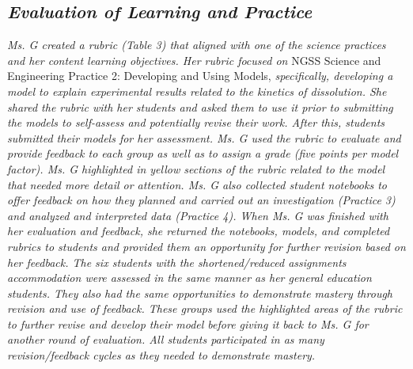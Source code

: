 \documentclass[11pt]{sig-alternate}
\begin{document}
\begin{large}
\subsection*{\textit{\textbf{Evaluation of Learning and Practice}}}
\textit{Ms. G created a rubric (Table 3) that aligned with one of the science practices and her content learning objectives. Her rubric focused on} NGSS Science and Engineering Practice 2: Developing and Using Models, \textit{specifically, developing a model to explain experimental results related to the kinetics of dissolution. She shared the rubric with her students and asked them to use it prior to submitting the models to self-assess and potentially revise their work. After this, students submitted their models for her assessment. Ms. G used the rubric to evaluate and provide feedback to each group as well as to assign a grade (five points per model factor). Ms. G highlighted in yellow sections of the rubric related to the model that needed more detail or attention. Ms. G also collected student notebooks to offer feedback on how they planned and carried out an investigation (Practice 3) and analyzed and interpreted data (Practice 4). When Ms. G was finished with her evaluation and feedback, she returned the notebooks, models, and completed rubrics to students and provided them an opportunity for further revision based on her feedback. The six students with the shortened/reduced assignments accommodation were assessed in the same manner as her general education students. They also had the same opportunities to demonstrate mastery through revision and use of feedback. These groups used the highlighted areas of the rubric to further revise and develop their model before giving it back to Ms. G for another round of evaluation. All students participated in as many revision/feedback cycles as they needed to demonstrate mastery.}


\end{large}
\end{document}
